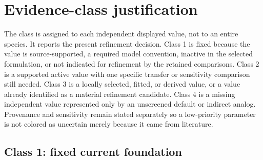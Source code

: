 \documentclass[10pt,oneside]{scrartcl}
\begin{document}
\section{Evidence-class justification}
\label{sec:class-justification}

The class is assigned to each independent displayed value, not to an entire
species. It reports the present refinement decision. Class 1 is fixed because
the value is source-supported, a required model convention, inactive in the
selected formulation, or not indicated for refinement by the retained
comparisons. Class 2 is a supported active value with one specific transfer or
sensitivity comparison still needed. Class 3 is a locally selected, fitted, or
derived value, or a value already identified as a material refinement
candidate. Class 4 is a missing independent value represented only by an
unscreened default or indirect analog. Provenance and sensitivity remain
stated separately so a low-priority parameter is not colored as uncertain
merely because it came from literature.

\subsection{Class 1: fixed current foundation}
\end{document}
